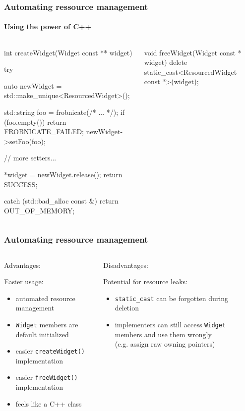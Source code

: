 \documentclass{beamer}
\def\code#1{\texttt{#1}}
\def\titleinframe#1{{\usebeamercolor[fg]{structure} #1}}
\begin{document}
\begin{frame}[fragile]
\frametitle{Automating ressource management}
\framesubtitle{Using the power of C++}
\begin{columns}
\begin{column}{0.45\textwidth}
\begin{TinyC++}
int createWidget(Widget const ** widget)
{
	try
	{
		auto newWidget = std::make_unique<ResourcedWidget>();
    
		std::string	foo = frobnicate(/* ... */);
		if (foo.empty())
		{
			return FROBNICATE_FAILED;
		}
		newWidget->setFoo(foo);

		// more setters...
    
		*widget = newWidget.release();
		return SUCCESS;
	}
	catch (std::bad_alloc const &)
	{
		return OUT_OF_MEMORY;
	}
}
\end{TinyC++}
\end{column}
\pause
\begin{column}{0.45\textwidth}
\begin{TinyC++}
void freeWidget(Widget const * widget)
{
	delete static_cast<ResourcedWidget const *>(widget);
}
\end{TinyC++}
\end{column}
\end{columns}
\end{frame}


\begin{frame}[fragile]
\frametitle{Automating ressource management}
\begin{columns}[T]
\begin{column}{0.45\textwidth}
	\titleinframe{Advantages:}
	
	\medskip
	Easier usage:	
	\begin{itemize}
	\pause
	\item automated resource management
	\pause
	\item \code{Widget} members are default initialized
	\pause
	\item easier \code{createWidget()} implementation
	\pause
	\item easier \code{freeWidget()} implementation
	\pause
	\item feels like a C++ class
	\end{itemize}
\end{column}
\pause
\begin{column}{0.45\textwidth}
	\titleinframe{Disadvantages:}
	
	\medskip
	Potential for resource leaks:
	\begin{itemize}
	\pause
	\item \code{static\_cast} can be forgotten during deletion
	\pause
	\item implementers can still access \code{Widget} members and use them wrongly \\
	(e.g. assign raw owning pointers)
	\end{itemize}

\end{column}
\end{columns}
\end{frame}
\end{document}
